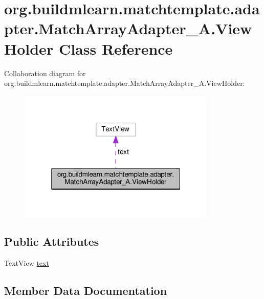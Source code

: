 \hypertarget{classorg_1_1buildmlearn_1_1matchtemplate_1_1adapter_1_1MatchArrayAdapter__A_1_1ViewHolder}{}\section{org.\+buildmlearn.\+matchtemplate.\+adapter.\+Match\+Array\+Adapter\+\_\+\+A.\+View\+Holder Class Reference}
\label{classorg_1_1buildmlearn_1_1matchtemplate_1_1adapter_1_1MatchArrayAdapter__A_1_1ViewHolder}


Collaboration diagram for org.\+buildmlearn.\+matchtemplate.\+adapter.\+Match\+Array\+Adapter\+\_\+\+A.\+View\+Holder\+:
\nopagebreak
\begin{figure}[H]
\begin{center}
\leavevmode
\includegraphics[width=268pt]{classorg_1_1buildmlearn_1_1matchtemplate_1_1adapter_1_1MatchArrayAdapter__A_1_1ViewHolder__coll__graph}
\end{center}
\end{figure}
\subsection*{Public Attributes}
\begin{DoxyCompactItemize}
\item 
Text\+View \hyperlink{classorg_1_1buildmlearn_1_1matchtemplate_1_1adapter_1_1MatchArrayAdapter__A_1_1ViewHolder_a42cec545e1c3db915dc48a759f8e758a}{text}
\end{DoxyCompactItemize}


\subsection{Member Data Documentation}
